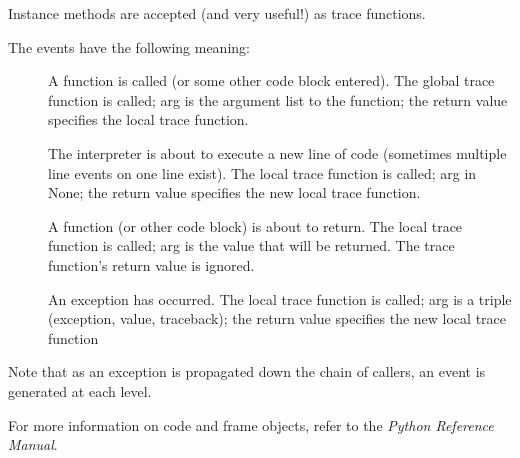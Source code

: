 Instance methods are accepted (and very useful!) as trace functions.

The events have the following meaning:

\begin{description}

\item[]
A function is called (or some other code block entered).  The global
trace function is called; arg is the argument list to the function;
the return value specifies the local trace function.

\item[]
The interpreter is about to execute a new line of code (sometimes
multiple line events on one line exist).  The local trace function is
called; arg in None; the return value specifies the new local trace
function.

\item[]
A function (or other code block) is about to return.  The local trace
function is called; arg is the value that will be returned.  The trace
function's return value is ignored.

\item[]
An exception has occurred.  The local trace function is called; arg is
a triple (exception, value, traceback); the return value specifies the
new local trace function

\end{description}

Note that as an exception is propagated down the chain of callers, an
 event is generated at each level.

For more information on code and frame objects, refer to the
\emph{Python Reference Manual}.
